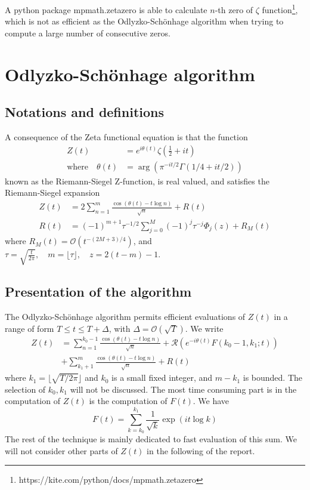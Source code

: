 \documentclass[conference,9pt]{IEEEtran}
\theoremstyle{definition}
\begin{document}
A python package mpmath.zetazero is able to calculate $n$-th zero of $\zeta$ function\footnote{https://kite.com/python/docs/mpmath.zetazero}, which is not as efficient as the Odlyzko-Sch{\" o}nhage algorithm when trying to compute a large number of consecutive zeros.
\section{Odlyzko-Sch{\" o}nhage algorithm}
\subsection{Notations and definitions}
A consequence of the Zeta functional equation is that the function
\begin{subequations}
    \begin{align*}
        Z(t)&=e^{i\theta(t)}\zeta\left(
            \frac{1}{2}+it
        \right)\\
        \text{where}\quad \theta(t)&=\arg(\pi^{-it/2}\Gamma(1/4+it/2))
    \end{align*}
\end{subequations}
known as the Riemann-Siegel Z-function, is real valued, and satisfies the Riemann-Siegel expansion
\begin{subequations}
    \begin{align*}
        Z(t)&=2\sum_{n=1}^m\frac{\cos(\theta(t)-t\log n)}{\sqrt{n}}+R(t)\\
        R(t)&=(-1)^{m+1}\tau^{-1/2}\sum_{j=0}^M(-1)^j\tau^{-j}\Phi_j(z)+R_M(t)
    \end{align*}
\end{subequations}
where $R_M(t)=\mathcal{O}(t^{-(2M+3)/4})$, and
    $\tau=\sqrt{\frac{t}{2\pi}},\quad m=\lfloor \tau\rfloor,\quad z=2(t-m)-1$.
\subsection{Presentation of the algorithm}
The Odlyzko-Sch{\" o}nhage algorithm permits efficient evaluations of $Z(t)$ in a range of form $T\leq t\leq T+\Delta$, with $\Delta=\mathcal{O}(\sqrt{T})$. We write
\begin{equation*}
    \begin{split}
        Z(t)&=\sum_{n=1}^{k_0-1}\frac{\cos(\theta(t)-t\log n)}{\sqrt{n}}+\mathcal{R}(e^{-i\theta(t)}F(k_0-1,k_1;t))\\
        &+\sum_{k_1+1}^{m}\frac{\cos(\theta(t)-t\log n)}{\sqrt{n}}+R(t)
    \end{split}
\end{equation*}
where $k_1=\lfloor \sqrt{T/2\pi}\rfloor$ and $k_0$ is a small fixed integer, and $m-k_1$ is bounded. The selection of $k_0, k_1$ will not be discussed. The most time consuming part is in the computation of $Z(t)$ is the computation of $F(t)$. We have
\begin{equation}
    \label{eq:Fdef}
    F(t)=\sum_{k=k_0}^{k_1}\frac{1}{\sqrt{k}}\exp(it\log k)
\end{equation}
The rest of the technique is mainly dedicated to fast evaluation of this sum. We will not consider other parts of $Z(t)$ in the following of the report.
\end{document}
